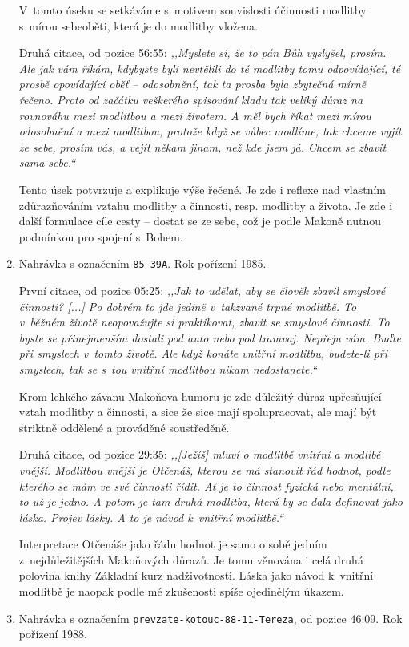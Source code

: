 \begin{enumerate}
{    V~tomto úseku se setkáváme s~motivem souvislosti účinnosti modlitby s~mírou
    sebeoběti, která je do modlitby vložena.

    Druhá citace, od pozice 56:55: \textit{%
      ,,Myslete si, že to pán Bůh vyslyšel, prosím. Ale jak vám říkám, kdybyste
      byli nevtělili do té modlitby tomu odpovídající, té prosbě opovídající
      oběť -- odosobnění, tak ta prosba byla zbytečná mírně řečeno. Proto od
      začátku veškerého spisování kladu tak veliký důraz na rovnováhu mezi
      modlitbou a mezi životem. A měl bych říkat mezi mírou odosobnění a mezi
      modlitbou, protože když se vůbec modlíme, tak chceme vyjít ze sebe, prosím
      vás, a vejít někam jinam, než kde jsem já. Chcem se zbavit sama sebe.``
    }

    Tento úsek potvrzuje a explikuje výše řečené. Je zde i reflexe nad vlastním
    zdůrazňováním vztahu modlitby a činnosti, resp. modlitby a života. Je zde i
    další formulace cíle cesty -- dostat se ze sebe, což je podle Makoně nutnou
    podmínkou pro spojení s~Bohem.
  }
  \item{
    Nahrávka s označením \texttt{85-39A}.
    Rok pořízení 1985.

    První citace, od pozice 05:25: \textit{%
      ,,Jak to udělat, aby se člověk zbavil smyslové činnosti? [...] Po dobrém to
      jde jedině v~takzvané trpné modlitbě. To v~běžném životě neopovažujte si
      praktikovat, zbavit se smyslové činnosti. To byste se přinejmenším dostali
      pod auto nebo pod tramvaj. Nepřeju vám. Buďte při smyslech v~tomto životě.
      Ale když konáte vnitřní modlitbu, budete-li při smyslech, tak se s~tou
      vnitřní modlitbou nikam nedostanete.``
    }

    Krom lehkého závanu Makoňova humoru je zde důležitý důraz upřesňující vztah
    modlitby a činnosti, a sice že sice mají spolupracovat, ale mají být
    striktně oddělené a prováděné soustředěně.

    Druhá citace, od pozice 29:35: \textit{%
      ,,[Ježíš] mluví o modlitbě vnitřní a modlibě vnější. Modlitbou vnější je
      Otčenáš, kterou se má stanovit řád hodnot, podle kterého se mám ve své
      činnosti řídit. Ať je to činnost fyzická nebo mentální, to už je jedno. A
      potom je tam druhá modlitba, která by se dala definovat jako láska. Projev
      lásky. A to je návod k~vnitřní modlitbě.``
    }

    Interpretace Otčenáše jako řádu hodnot je samo o sobě jedním
    z~nejdůležitějších Makoňových důrazů. Je tomu věnována i celá druhá polovina
    knihy Základní kurz nadživotnosti\cite{KaMaZKN}. Láska jako návod k~vnitřní
    modlitbě je naopak podle mé zkušenosti spíše ojedinělým úkazem.
  }
  \item{
    Nahrávka s označením \texttt{prevzate-kotouc-88-11-Tereza}, od pozice 46:09.
    Rok pořízení 1988.

}
\end{enumerate}
